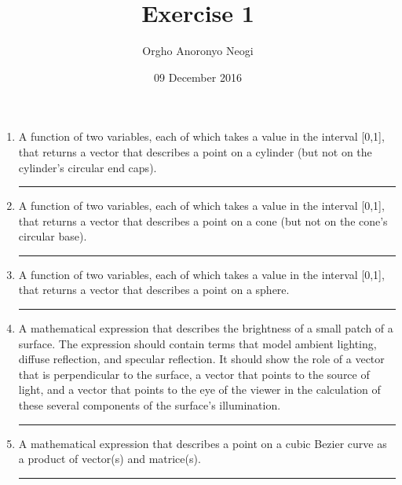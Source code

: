 \documentclass[oneside]{article}
\title{Exercise 1}
\author{Orgho Anoronyo Neogi}
\date{09 December 2016}
\newenvironment{answer}
  {\vspace*{0.2cm} \rule{12cm}{0.02cm} \vspace*{0.2cm}}
  {\vspace*{0.2cm}}
\begin{document}
\maketitle

\begin{enumerate}
\item A function of two variables, each of which takes a value in the interval [0,1], that returns a vector that describes a point on a cylinder (but not on the cylinder's circular end caps).

\begin{answer}

\end{answer}

\item A function of two variables, each of which takes a value in the interval [0,1], that returns a vector that describes a point on a cone (but not on the cone's circular base).

\begin{answer}

\end{answer}

\item A function of two variables, each of which takes a value in the interval [0,1], that returns a vector that describes a point on a sphere.

\begin{answer}

\end{answer}

\item A mathematical expression that describes the brightness of a small patch of a surface. The expression should contain terms that model ambient lighting, diffuse reflection, and specular reflection. It should show the role of a vector that is perpendicular to the surface, a vector that points to the source of light, and a vector that points to the eye of the viewer in the calculation of these several components of the surface's illumination.

\begin{answer}

\end{answer}

\item A mathematical expression that describes a point on a cubic Bezier curve as a product of vector(s) and matrice(s).

\begin{answer}


\end{answer}
\end{enumerate}
\end{document}
